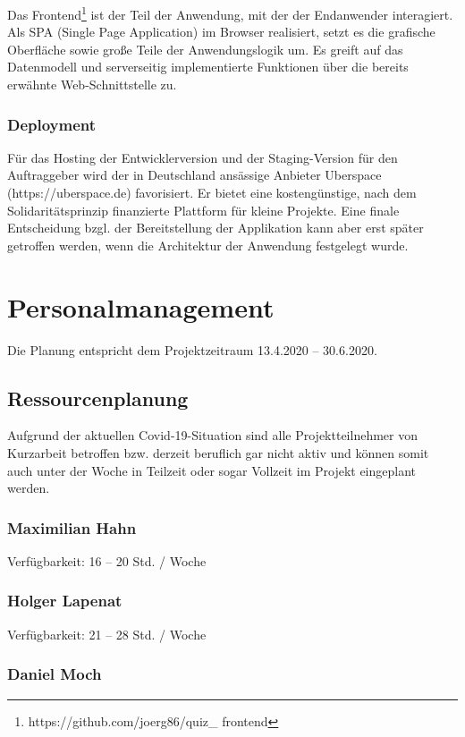 \documentclass[a4paper,11pt,listof=numbered,glossary=totoc,parskip=half]{scrreprt}
\begin{document}
Das Frontend\footnote{https://github.com/joerg86/quiz\_ frontend} ist der Teil der Anwendung, mit der der Endanwender interagiert. Als SPA (Single Page Application) im Browser realisiert, setzt es die grafische Oberfläche sowie große Teile der Anwendungslogik um.
Es greift auf das Datenmodell und serverseitig implementierte Funktionen über die bereits erwähnte Web-Schnittstelle zu.

\subsection{Deployment}

Für das Hosting der Entwicklerversion und der Staging-Version für den Auftraggeber wird der in Deutschland ansässige Anbieter Uberspace (https://uberspace.de) favorisiert.
Er bietet eine kostengünstige, nach dem Solidaritätsprinzip finanzierte Plattform für kleine Projekte.
Eine finale Entscheidung bzgl. der Bereitstellung der Applikation kann aber erst später getroffen werden, wenn die Architektur der Anwendung festgelegt wurde.
	\newpage
	\chapter{Personalmanagement}

Die Planung entspricht dem Projektzeitraum 13.4.2020 -- 30.6.2020.

\section{Ressourcenplanung}
Aufgrund der aktuellen Covid-19-Situation sind alle Projektteilnehmer von Kurzarbeit betroffen bzw. derzeit beruflich gar nicht aktiv und können somit auch unter der Woche in Teilzeit oder sogar Vollzeit im Projekt eingeplant werden.

\subsection{Maximilian Hahn}

Verfügbarkeit: 16 -- 20 Std. / Woche

\subsection{Holger Lapenat}

Verfügbarkeit: 21 -- 28 Std. / Woche

\subsection{Daniel Moch}
\end{document}
